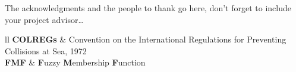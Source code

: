 \documentclass[
21pt, %
oneside, %
english, %
onehalfspacing, %
nolistspacing, %
headsepline, %
chapterinoneline, %
]{MastersDoctoralThesis} %
\begin{document}

\begin{acknowledgements}
    \addchaptertocentry{\acknowledgementname} %
    The acknowledgments and the people to thank go here, don't forget to include your project advisor\ldots
\end{acknowledgements}


\tableofcontents %

\listoffigures %

\listoftables %


\begin{abbreviations}{ll} %
    \textbf{COLREGs}  & Convention on the International Regulations for Preventing Collisions at Sea, 1972\\
    \textbf{FMF} & \textbf{F}uzzy \textbf{M}embership \textbf{F}unction\\

\end{abbreviations}



\end{document}
